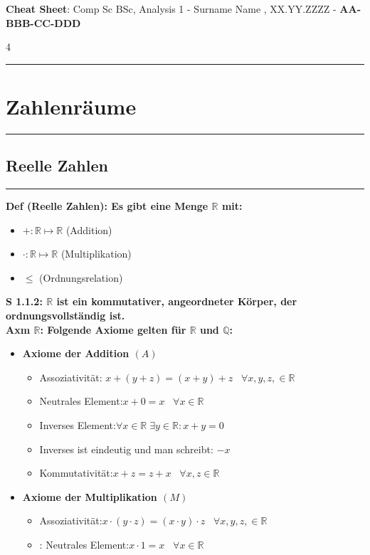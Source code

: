 \documentclass[7pt,landscape, margin = 0.1mm]{article}
\newcommand{\titellinie}{\rule{1.\linewidth}{0.75pt}}
\newcommand*{\mysection}[2][black]{\vskip 0pt \titellinie\vspace{-20pt}\section{#2}\vspace{-14pt}\titellinie \colorlet{chaptecolor}{#1}}
\newcommand*{\mysubsection}[1]{\vspace{-2mm}\color{chaptercolor}\subsection{ #1 }
\vspace{-1mm}\hrule\vspace{1.5mm}\color{black}
\vspace{2mm}}
\newcommand{\COL}[1]{ \color{chaptercolor} \bf{#1}\color{black}     \\}
\newcommand{\DEF}[2]{\color{chaptercolor}\bf{Def #1}:\color{black}    \hspace{0.2cm} #2 \\}
\newcommand{\SA}[2]{\color{chaptercolor}\bf{S #1}:\color{black}    \hspace{0.2cm} #2 \\}
\newcommand{\AX}[2]{\color{chaptercolor}\bf{Axm #1}:\color{black}    \hspace{0.2cm} #2 \\}
\begin{document}
\syntaxonly
\centering
{}
\raggedcolumns

\scriptsize

\begin{center}
     \Large{\textbf{Cheat Sheet}: Comp Sc BSc, Analysis 1 - Surname Name , XX.YY.ZZZZ - \textbf{AA-BBB-CC-DDD}} \\
\end{center}
\begin{multicols}{4}
\setlength{\premulticols}{0.5pt}
\setlength{\postmulticols}{0.5pt}
\setlength{\multicolsep}{0.5pt}
\setlength{\columnsep}{0.2pt}
\setlength{\columnseprule}{0.4pt}

\begin{flushleft}

\mysection[red]{\centering Zahlenräume}
\mysubsection{Reelle Zahlen}
\DEF{(Reelle Zahlen)}{Es gibt eine Menge $\mathbb{R}$ mit:
\begin{itemize}
\item $+: \mathbb{R} \mapsto \mathbb{R}$ (Addition)
\item $\cdot : \mathbb{R} \mapsto \mathbb{R}$ (Multiplikation)
\item $\leq$ (Ordnungsrelation)}
\end{itemize}
\SA{1.1.2}{$\mathbb{R}$ ist ein kommutativer, angeordneter Körper, der ordnungsvollständig ist.}
\AX{$\mathbb{R}$}{Folgende Axiome gelten für $\mathbb{R}$ und $\mathbb{Q}$:
\begin{itemize}
\item \COL{Axiome der Addition $(A)$}
\begin{itemize}
\item[$(A1)$] Assoziativität: $x + (y + z) = (x+y)+z \; \; \; \forall x,y,z, \in \mathbb{R}$
\item[$(A2)$] Neutrales Element:$x + 0 = x \; \; \; \forall x \in \mathbb{R}$
\item [$(A3)$] Inverses Element:$\forall x \in \mathbb{R} \; \exists y \in \mathbb{R}: x+y = 0$
\item Inverses ist eindeutig und man schreibt: $-x$
\item[$(A4)$] Kommutativität:$x+z = z+x \; \; \; \forall x,z \in \mathbb{R}$
\end{itemize}
\item \COL{Axiome der Multiplikation $(M)$}
\begin{itemize}
\item[$(M1)$] Assoziativität:$x \cdot (y \cdot z) = (x\cdot y)\cdot z \; \; \; \forall x,y,z, \in \mathbb{R}$
\item[$(M2)$]: Neutrales Element:$x \cdot 1 = x \; \; \; \forall x \in \mathbb{R}$

\end{itemize}
\end{itemize}}
\end{flushleft}
\end{multicols}
\end{document}
